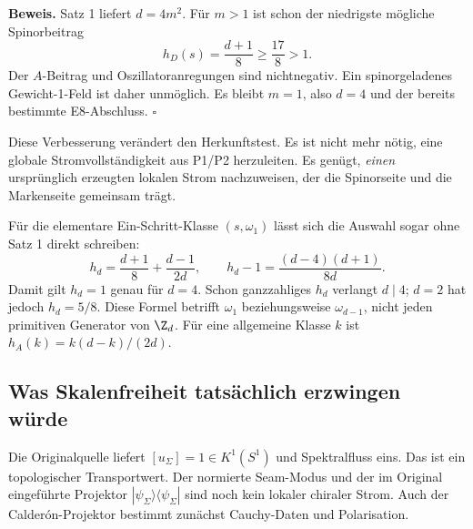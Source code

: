 \textbf{Beweis.} Satz 1 liefert $d=4m^2$. Für $m>1$ ist schon der niedrigste mögliche Spinorbeitrag
\[
 h_D(s)=\frac{d+1}{8}\ge\frac{17}{8}>1.
\]
Der $A$-Beitrag und Oszillatoranregungen sind nichtnegativ. Ein spinorgeladenes Gewicht-1-Feld ist daher unmöglich. Es bleibt $m=1$, also $d=4$ und der bereits bestimmte E8-Abschluss. $\square$

Diese Verbesserung verändert den Herkunftstest. Es ist nicht mehr nötig, eine globale Stromvollständigkeit aus P1/P2 herzuleiten. Es genügt, \emph{einen} ursprünglich erzeugten lokalen Strom nachzuweisen, der die Spinorseite und die Markenseite gemeinsam trägt.

Für die elementare Ein-Schritt-Klasse $(s,\omega_1)$ lässt sich die Auswahl sogar ohne Satz 1 direkt schreiben:
\begin{equation}\label{eq:primitivecurrentweight}
 h_d=\frac{d+1}{8}+\frac{d-1}{2d},\qquad
 h_d-1=\frac{(d-4)(d+1)}{8d}.
\end{equation}
Damit gilt $h_d=1$ genau für $d=4$. Schon ganzzahliges $h_d$ verlangt $d\mid4$; $d=2$ hat jedoch $h_d=5/8$. Diese Formel betrifft $\omega_1$ beziehungsweise $\omega_{d-1}$, nicht jeden primitiven Generator von $\Z_d$. Für eine allgemeine Klasse $k$ ist $h_A(k)=k(d-k)/(2d)$.

\subsection{Was Skalenfreiheit tatsächlich erzwingen würde}\label{sec:seamwardsource}

Die Originalquelle liefert $[u_\Sigma]=1\in K^1(S^1)$ und Spektralfluss eins. Das ist ein topologischer Transportwert. Der normierte Seam-Modus und der im Original eingeführte Projektor $|\psi_\Sigma\rangle\langle\psi_\Sigma|$ sind noch kein lokaler chiraler Strom. Auch der Calderón-Projektor bestimmt zunächst Cauchy-Daten und Polarisation.

